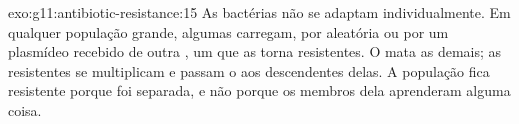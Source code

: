 \begin{solution}{exo:g11:antibiotic-resistance:15}
As bactérias não se adaptam individualmente. Em qualquer população
grande, algumas  carregam, por  aleatória ou por um
plasmídeo recebido de outra , um  que as torna resistentes.
O  mata as demais; as  resistentes se multiplicam e
passam o  aos descendentes delas. A população fica resistente
porque foi separada, e não porque os membros dela aprenderam alguma
coisa.
\end{solution}

